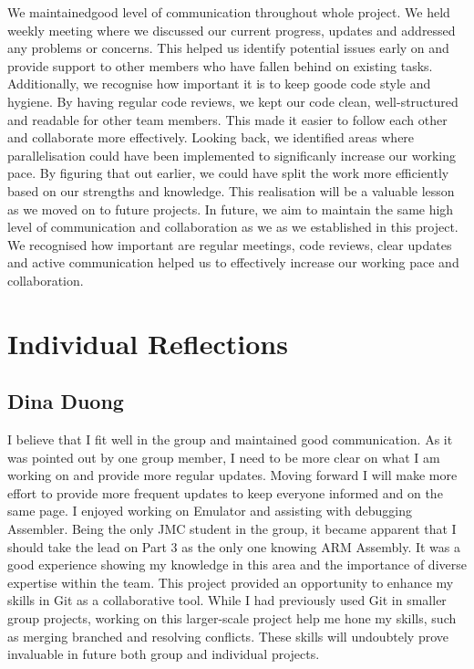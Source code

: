 \documentclass[11pt]{article}
\begin{document}
We maintainedgood level of communication throughout whole project. We held weekly meeting where we discussed
our current progress, updates and addressed any problems or concerns. This helped us identify potential issues early on 
and provide support to other members who have fallen behind on existing tasks. 
\newline 
Additionally, we recognise how important it is to keep goode code style and hygiene. By having regular code reviews,
we kept our code clean, well-structured and readable for other team members. This made it easier to follow each other and 
collaborate more effectively. 
\newline
Looking back, we identified areas where parallelisation could have been implemented to significanly increase our working pace. 
By figuring that out earlier, we could have split the work more efficiently based on our strengths and knowledge.
This realisation will be a valuable lesson as we moved on to future projects.
\newline
In future, we aim to maintain the same high level of communication and collaboration as we as we established in this project.
We recognised how important are regular meetings, code reviews, clear updates and active communication helped us 
to effectively increase our working pace and collaboration.

\section{Individual Reflections}

\subsection{Dina Duong}

I believe that I fit well in the group and maintained good communication. 
As it was pointed out by one group member, I need to be more clear on what I am working on and provide more regular updates. 
Moving forward I will make more effort to provide more frequent updates to keep everyone informed and on the same page.
\newline
I enjoyed working on Emulator and assisting with debugging Assembler. Being the only JMC student in the group,
it became apparent that I should take the lead on Part 3 as the only one knowing ARM Assembly.
It was a good experience showing my knowledge in this area and the importance of diverse expertise within the team.
\newline
This project provided an opportunity to enhance my skills in Git as a collaborative tool. While I had previously used Git in 
smaller group projects, working on this larger-scale project help me hone my skills, such as merging branched and resolving conflicts.
These skills will undoubtely prove invaluable in future both group and individual projects.
\end{document}
